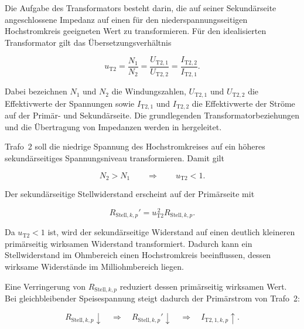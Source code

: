 Die Aufgabe des Transformators besteht darin, die auf seiner
Sekundärseite angeschlossene Impedanz auf einen für den
niederspannungsseitigen Hochstromkreis geeigneten Wert zu
transformieren. Für den idealisierten Transformator gilt das
Übersetzungsverhältnis

\begin{equation}
    u_{\mathrm{T2}}
    =
    \frac{N_1}{N_2}
    =
    \frac{U_{\mathrm{T2},1}}{U_{\mathrm{T2},2}}
    =
    \frac{I_{\mathrm{T2},2}}{I_{\mathrm{T2},1}}.
    \label{eq:uebersetzungsverhaeltnis_trafo2}
\end{equation}

Dabei bezeichnen \(N_1\) und \(N_2\) die Windungszahlen,
\(U_{\mathrm{T2},1}\) und \(U_{\mathrm{T2},2}\) die Effektivwerte der
Spannungen sowie \(I_{\mathrm{T2},1}\) und
\(I_{\mathrm{T2},2}\) die Effektivwerte der Ströme auf der Primär-
und Sekundärseite. Die grundlegenden Transformatorbeziehungen und die
Übertragung von Impedanzen werden in
\textcite[Abschn.~2.1.2--2.1.5 und 2.3.3,
S.~109--114 und 136--141]{spring2009maschinen} hergeleitet.

Trafo~2 soll die niedrige Spannung des Hochstromkreises auf ein
höheres sekundärseitiges Spannungsniveau transformieren. Damit gilt

\begin{equation}
    N_2 > N_1
    \qquad\Longrightarrow\qquad
    u_{\mathrm{T2}} < 1.
    \label{eq:trafo2_spannungserhoehung}
\end{equation}

Der sekundärseitige Stellwiderstand erscheint auf der Primärseite mit

\begin{equation}
    R_{\mathrm{Stell},k,p}'
    =
    u_{\mathrm{T2}}^{\,2}
    R_{\mathrm{Stell},k,p}.
    \label{eq:stellwiderstand_transformation}
\end{equation}

Da \(u_{\mathrm{T2}}<1\) ist, wird der sekundärseitige Widerstand auf
einen deutlich kleineren primärseitig wirksamen Widerstand
transformiert. Dadurch kann ein Stellwiderstand im Ohmbereich einen
Hochstromkreis beeinflussen, dessen wirksame Widerstände im
Milliohmbereich liegen.

Eine Verringerung von \(R_{\mathrm{Stell},k,p}\) reduziert dessen
primärseitig wirksamen Wert. Bei gleichbleibender Speisespannung
steigt dadurch der Primärstrom von Trafo~2:

\begin{equation}
    R_{\mathrm{Stell},k,p} \downarrow
    \quad\Longrightarrow\quad
    R_{\mathrm{Stell},k,p}' \downarrow
    \quad\Longrightarrow\quad
    I_{\mathrm{T2},1,k,p} \uparrow.
    \label{eq:stellrichtung_trafo2}
\end{equation}

